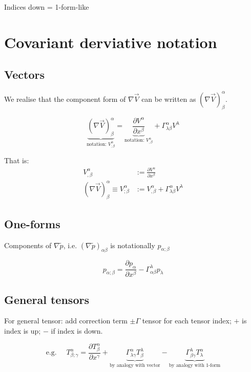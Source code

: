 \documentclass[a4paper]{article} %
\renewcommand{\tilde}{\widetilde}
\begin{document}
Indices down = 1-form-like

\section{Covariant derviative notation}
\subsection{Vectors}
We realise that the component form of $\nabla \vec{V}$ can be written as $(\nabla \vec{V})^{\alpha}_{\beta}$.

\begin{equation}
\underbrace{(\nabla \vec{V})^{\alpha}_{\beta}}_{\text{notation: }V^{\alpha}_{;\beta}}=
\underbrace{\frac{\partial V^{\alpha}}{\partial x^{\beta}}}_{\text{notation: }V^{\alpha}_{,\beta}}
+\Gamma^{\alpha}_{\lambda\beta}V^{\lambda}
\end{equation}

That is:
\begin{align}
V^{\alpha}_{,\beta}&:=\frac{\partial V^{\alpha}}{\partial x^{\beta}}\\
(\nabla \vec{V})^{\alpha}_{\beta}\equiv V^{\alpha}_{;\beta}&:=V^{\alpha}_{,\beta}+\Gamma^{\alpha}_{\lambda\beta}V^{\lambda}
\end{align}

\subsection{One-forms}
Components of $\nabla\tilde{p}$, i.e. $(\nabla\tilde{p})_{\alpha\beta}$ is notationally $p_{\alpha;\beta}$

\begin{equation}
p_{\alpha;\beta}=\frac{\partial p_{\alpha}}{\partial x^{\beta}}-\Gamma^{\lambda}_{\alpha\beta} p_{\lambda}
\end{equation}

\subsection{General tensors}
For general tensor: add correction term $\pm \Gamma$ tensor for each tensor index; $+$ is index is up; $-$ if index is down.

\begin{equation}
\text{e.g. }\quad T^{\alpha}_{\beta;\gamma}=\frac{\partial T^{\alpha}_{\beta}}{\partial x^{\gamma}}
+\underbrace{\Gamma^{\alpha}_{\lambda\gamma} T^{\lambda}_{\beta}}_{\text{by analogy with vector}}
-\underbrace{\Gamma^{\lambda}_{\beta \gamma}T^{\alpha}_{\lambda}}_{\text{by analogy with 1-form}}
\end{equation}
\end{document}

